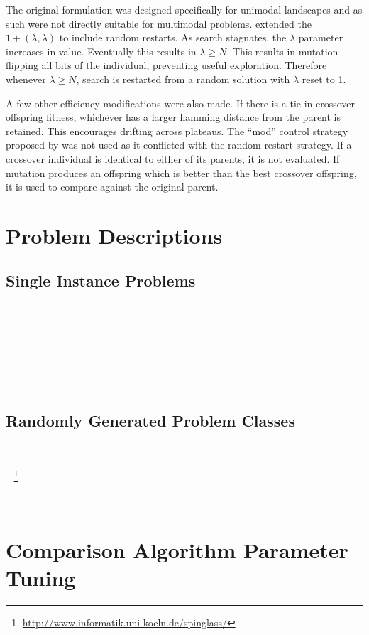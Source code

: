 \documentclass[twoside]{article}
\begin{document}
The original formulation was designed specifically for unimodal landscapes and as such were
not directly suitable for multimodal problems. \cite{goldman:2014:p3} extended the $1+(\lambda, \lambda)$
to include random restarts. As search stagnates, the $\lambda$ parameter increases in value. Eventually
this results in $\lambda \ge N$. This results in mutation flipping all bits of the individual, preventing
useful exploration. Therefore whenever $\lambda \ge N$, search is restarted from a random solution with $\lambda$
reset to 1.

A few other efficiency modifications were also made. If there is a tie in crossover offspring fitness,
whichever has a larger hamming distance from the parent is retained. This encourages drifting across plateaus.
The ``mod'' control strategy proposed by \cite{doerr:2013:lambdalambda} was not used as it conflicted with
the random restart strategy.
If a crossover individual is identical to either of its parents, it is not evaluated.
If mutation produces an offspring which is better than the best crossover offspring, it is used to compare
against the original parent.

\section{Problem Descriptions}
\label{sec-problems}

\subsection{Single Instance Problems}
~\cite{goldberg:1991:gasize} %

~\cite{goldman:2012:ltga} %

~\cite{thierens:2013:ltgahiff} %

~\cite{goldman:2014:p3} %

\subsection{Randomly Generated Problem Classes}

~\cite{wright:2000:solvingnk}

~\cite{saul:1994:spinglass}
\footnote{\url{http://www.informatik.uni-koeln.de/spinglass/}}

~\cite{goldman:2014:p3} %

\section{Comparison Algorithm Parameter Tuning}
\label{sec-tuning}
\end{document}

